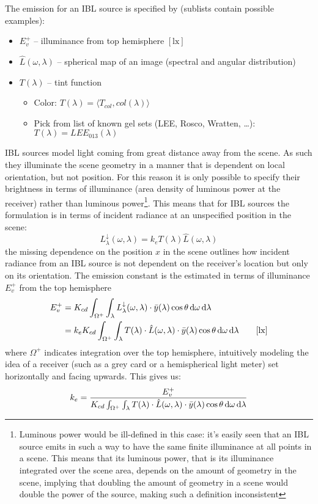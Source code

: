 The emission for an \gls{IBL} source is specified by (sublists contain possible examples):

\begin{itemize}
\item $E^+_v$ -- illuminance from top hemisphere $[\unit{\lux}]$
\item $\hat{L}(\omega,\lambda)$ -- spherical map of an image (spectral and angular distribution)
\item $T(\lambda)$ -- tint function
  \begin{itemize}\small\it
  \item Color: $T(\lambda) = \langle T_{col}, col(\lambda) \rangle$
  \item Pick from list of known gel sets (LEE, Rosco, Wratten, \ldots): $T(\lambda) = LEE_{013} (\lambda)$
  \end{itemize}
\end{itemize}
\Gls{IBL} sources model light coming from great distance away from the scene. As
such they illuminate the scene geometry in a manner that is dependent on
local orientation, but not position. For this reason it is only possible to
specify their brightness in terms of illuminance (area density of luminous power
at the receiver) rather than luminous power\footnote{Luminous power would be
ill-defined in this case: it's easily seen that an \gls{IBL} source emits in
such a way to have the same finite illuminance at all points in a scene. This
means that its luminous power, that is its illuminance integrated over the scene
area, depends on the amount of geometry in the scene, implying that doubling the
amount of geometry in a scene would double the power of the source, making
such a definition inconsistent}.
This means that for \gls{IBL} sources the formulation is in terms of incident
radiance at an unspecified position in the scene:
\begin{equation}
L_{\lambda}^\downarrow(\omega,\lambda) = k_e T(\lambda) \hat{L}(\omega,\lambda)
\end{equation}
the missing dependence on the position $x$ in the scene outlines how incident
radiance from an \gls{IBL} source is not dependent on the receiver's location
but only on its orientation. The emission constant is the estimated in terms of
illuminance $E^+_v$ from the top hemisphere
\begin{align*}
E^+_v &= K_{cd} \int_{\Omega^+} \int_\lambda L_{\lambda}^\downarrow(\omega,\lambda)
\cdot\bar y(\lambda) \cos\theta \d\omega\d\lambda \\
&= k_e K_{cd}\int_{\Omega^+}\int_{\lambda} T(\lambda) \cdot \hat{L}(\omega,\lambda)
\cdot\bar y(\lambda) \cos\theta \d\omega\d\lambda
\qquad [\unit{\lux}]
\end{align*}
where $\Omega^+$ indicates integration over the top hemisphere, intuitively
modeling the idea of a receiver (such as a grey card or a hemispherical light
meter) set horizontally and facing upwards. This gives us:
\begin{equation}
k_e = \frac{E^+_v}{K_{cd}\int_{\Omega^+}\int_{\lambda} T(\lambda) \cdot
\hat{L}(\omega,\lambda) \cdot \bar y(\lambda)\cos\theta \mathop{}\!\mathrm{d}\omega\mathop{}\!\mathrm{d}\lambda}
\end{equation}

